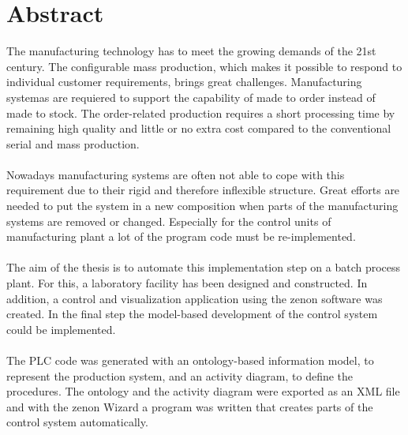 \chapter*{Abstract}

The manufacturing technology has to meet the growing demands of the 21st century. The configurable mass production, which makes it possible to respond to individual customer requirements, brings great challenges. Manufacturing systemas are requiered to support the capability of made to order instead of made to stock. The order-related production requires a short processing time by remaining high quality and little or no extra cost compared to the conventional serial and mass production. \\\\
Nowadays manufacturing systems are often not able to cope with this requirement due to their rigid and therefore inflexible structure. Great efforts are needed to put the system in a new composition when parts of the manufacturing systems are removed or changed. Especially for the control units of manufacturing plant a lot of the program code must be re-implemented.\\\\
The aim of the thesis is to automate this implementation step on a batch process plant. For this, a laboratory facility has been designed and constructed. In addition, a control and visualization application using the zenon software was created. In the final step the model-based development of the control system could be implemented.\\\\
The PLC code was generated with an ontology-based information model, to represent the production system, and an activity diagram, to define the procedures. The ontology and the activity diagram were exported as an \ac{XML} file and with the zenon Wizard a program was written that creates parts of the control system automatically.